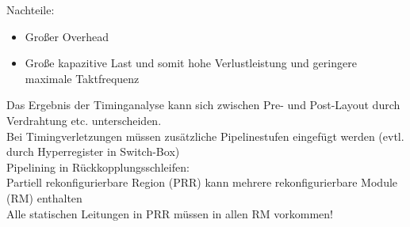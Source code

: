 \documentclass[english]{latex4ei/latex4ei_sheet}
\begin{document}
Nachteile:
\begin{itemize}
	\item Großer Overhead
	\item Große kapazitive Last und somit hohe Verlustleistung und geringere maximale Taktfrequenz
\end{itemize}

Das Ergebnis der Timinganalyse kann sich zwischen Pre- und Post-Layout durch Verdrahtung etc. unterscheiden.\\
Bei Timingverletzungen müssen zusätzliche Pipelinestufen eingefügt werden (evtl. durch Hyperregister in Switch-Box)\\
Pipelining in Rückkopplungsschleifen:\\

Partiell rekonfigurierbare Region (PRR) kann mehrere rekonfigurierbare Module (RM) enthalten\\
Alle statischen Leitungen in PRR müssen in allen RM vorkommen!\\





\end{document}
